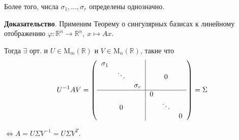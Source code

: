 \documentclass[a4paper, 12pt]{article}
\newcommand{\R}{\mathbb{R}}
\begin{document}
Более того, числа $\sigma_1, \ldots, \sigma_r$ определены однозначно.

\textbf{Доказательство}. Применим Теорему о сингулярных базисах к линейному отображению $\varphi: \R^n \rightarrow \R^n,\ x \mapsto Ax$.

Тогда $\exists$ орт. и $U \in \text{M}_m(\R)$ и $V \in \text{M}_n(\R)$, такие что
\[
U^{-1}AV = 
\left(\begin{tabular}{ccc|ccc}
$\sigma_1$ &          &            &   &          &   \\
& $\ddots$ &            &   &     0    &   \\
&          & $\sigma_r$ &   &          &   \\ \hline
&          &            & 0 &          &   \\
&    0     &            &   & $\ddots$ &   \\
&          &            &   &          & 0
\end{tabular}\right) = \Sigma
\]

$\Leftrightarrow A = U\Sigma V^{-1} = U\Sigma V^T$.
\end{document}
